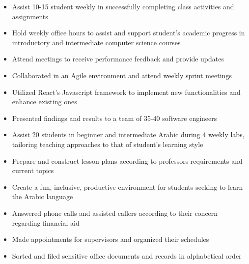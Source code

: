 {}
\begin{itemize}
    \item Assist 10-15  student weekly in successfully completing class activities and assignments
    \item Hold weekly office hours to assist and support student’s academic progress in introductory and intermediate computer science courses
    \item Attend meetings to receive performance feedback and provide updates
\end{itemize}
\smallskip
{}
\begin{itemize}
    \item Collaborated in an Agile environment and attend weekly sprint meetings
    \item Utilized React’s Javascript framework to implement new functionalities and enhance existing ones
    \item Presented findings and results to a team of 35-40 software engineers
\end{itemize}
\smallskip
{}
\begin{itemize}
    \item Assist 20 students in beginner and intermediate Arabic during 4 weekly labs, tailoring teaching approaches to that of student’s learning style
    \item Prepare and construct lesson plans according to professors requirements and current topics
    \item Create a fun, inclusive, productive environment for students seeking to learn the Arabic language
\end{itemize}
\smallskip
{}
\begin{itemize}
    \item Answered phone calls and assisted callers according to their concern regarding financial aid
    \item Made appointments for supervisors and organized their schedules
    \item Sorted and filed sensitive office documents and records in alphabetical order
\end{itemize}
